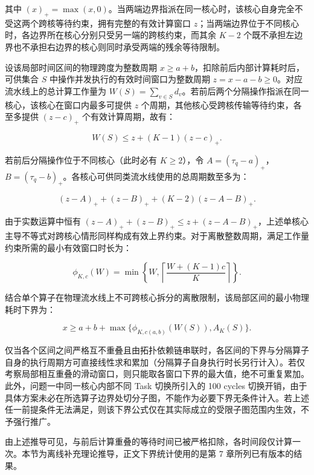 \documentclass[anonymous,withtoc]{gmcm2026}
\begin{document}
其中 \((x)_+ = \max(x, 0)\)。当两端边界指派在同一核心时，该核心自身完全不受这两个跨核等待约束，拥有完整的有效计算窗口 \(z\)；当两端边界位于不同核心时，各边界所在核心分别只受另一端的跨核约束，而其余 \(K - 2\) 个既不承担左边界也不承担右边界的核心则同时承受两端的残余等待限制。

设该局部时间区间的物理跨度为整数周期 \(x \ge a + b\)，扣除前后内部计算耗时后，可供集合 \(S\) 中操作并发执行的有效时间窗口为整数周期 \(z = x - a - b \ge 0\)。对应流水线上的总计算工作量为 \(W(S) = \sum_{v \in S} d_v\)。若前后两个分隔操作指派在同一核心，该核心在窗口内最多可提供 \(z\) 个周期，其他核心受跨核传输等待约束，各至多提供 \((z - c)_+\) 个有效计算周期，故有：

\begin{equation}
W(S) \le z + (K - 1)(z - c)_+.
\end{equation}

若前后分隔操作位于不同核心（此时必有 \(K \ge 2\)），令 \(A = (\tau_q - a)_+\)，\(B = (\tau_q - b)_+\)。各核心可供同类流水线使用的总周期数至多为：

\begin{equation}
(z - A)_+ + (z - B)_+ + (K - 2)(z - A - B)_+.
\end{equation}

由于实数运算中恒有 \((z - A)_+ + (z - B)_+ \le z + (z - A - B)_+\)，上述单核心主导不等式对跨核心情形同样构成有效上界约束。对于离散整数周期，满足工作量约束所需的最小有效窗口时长为：

\begin{equation}
\phi_{K,c}(W) = \min\left\{W, \left\lceil\frac{W + (K - 1)c}{K}\right\rceil\right\}.
\end{equation}

结合单个算子在物理流水线上不可跨核心拆分的离散限制，该局部区间的最小物理耗时下界为：

\begin{equation}
x \ge a + b + \max\{\phi_{K, c(a,b)}(W(S)), A_K(S)\}.
\end{equation}

仅当各个区间之间严格互不重叠且由拓扑依赖链串联时，各区间的下界与分隔算子自身的执行周期方可直接线性求和累加（分隔算子自身执行时长另行计入）。若仅考察局部相互重叠的滑动窗口，则只能取各窗口下界的最大值，绝不可重复累加。此外，问题一中同一核心内部不同 Task 切换所引入的 100 cycles 切换开销，由于具体方案未必在所选算子边界处切分子图，不能作为必要下界无条件计入。若上述任一前提条件无法满足，则该下界公式仅在其实际成立的受限子图范围内生效，不予强行推广。

由上述推导可见，与前后计算重叠的等待时间已被严格扣除，各时间段仅计算一次。本节为离线补充理论推导，正文下界统计使用的是第 7 章所列已有版本的结果。
\end{document}
